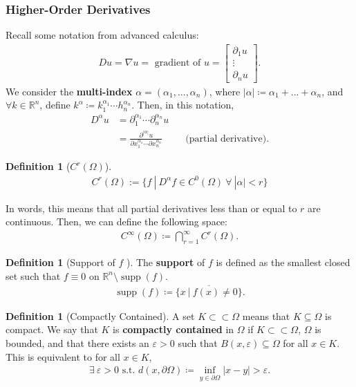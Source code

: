 \documentclass[psamsfonts]{amsart}
\newcommand{\given}{\ |\ }
\theoremstyle{definition}
\newtheorem{defn}[thm]{Definition}
\theoremstyle{remark}
\newcommand{\R}[0]{\mathbb{R}}
\newcommand{\eps}[0]{\varepsilon}
\numberwithin{equation}{section}
\begin{document}
\subsubsection{Higher-Order Derivatives}
Recall some notation from advanced calculus: 
\begin{align}
	\boxed{Du = \nabla u = \text{ gradient of } u = \begin{bmatrix}
		\partial_1 u \\
		\vdots \\
		\partial_n u 
	\end{bmatrix}}.	
\end{align}
We consider the \textbf{multi-index} \( \alpha = (\alpha_1, ..., \alpha_n ) \), where \( |\alpha| \coloneqq \alpha_1 + ... + \alpha_n \), and \( \forall k \in \R^n \), define \( k^\alpha \coloneqq k_1^{\alpha_1} \cdots h_n^{\alpha_n} \). Then, in this notation, 
\begin{align*}
	D^\alpha u &  = \partial_1^{\alpha_1} \cdots \partial_n^{\alpha_n} u  \\
			& = \frac{\partial^{|\alpha|} u}{\partial x_1^{\alpha_1} \cdots \partial x_n^{\alpha_n}} \hspace{1cm} \text{(partial derivative)}.
\end{align*}

\begin{defn}[\(C^r(\Omega) \)]
	\begin{align} 
C^r(\Omega) := \{ f \given D^\alpha f \in C^0(\Omega)\ \forall\ |\alpha| < r \} 		
	\end{align}
\end{defn}
In words, this means that all partial derivatives less than or equal to \( r \) are continuous. Then, we can define the following space:
\begin{align}
	C^\infty (\Omega) \coloneqq \bigcap_{r=1}^\infty C^r(\Omega).	
\end{align}

\begin{defn}[Support of \( f \) ]
		The \textbf{support} of \( f \) is defined as the smallest closed set such that \( f \equiv 0 \) on \( \R^n \setminus \operatorname{supp}(f) \).
		\begin{align}
			\operatorname{supp} (f) \coloneqq \overline{\{ x \given f(x) \neq 0 \} }.
		\end{align}
\end{defn}

\begin{defn}[Compactly Contained]
	A set \( K \subset \subset \Omega \) means that \( K \subseteq \Omega \) is compact. We say that \( K \) is \textbf{compactly contained} in \( \Omega \) if \( K \subset \subset \Omega \), \( \Omega\) is bounded, and that there exists an \( \eps > 0 \) such that \( B(x, \eps ) \subseteq \Omega \) for all \( x \in K \). This is equivalent to for all \( x \in K \), 
	\begin{align}
		\exists\ \eps > 0 \text{ s.t. } d(x, \partial \Omega) \coloneqq \inf_{y \in \partial \Omega} |x-y| > \eps.
	\end{align}
\end{defn}
\end{document}
